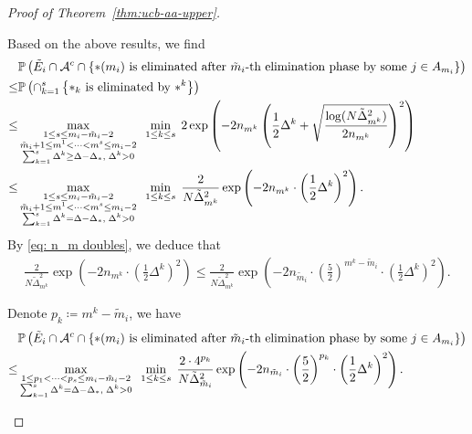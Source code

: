 \documentclass[
  12pt]{article}
\begin{document}
\begin{proof}[Proof of Theorem~\ref{thm:ucb-aa-upper}]
\begin{itemize}
Based on the above results, we find
\begin{align}
&\mathbb{P}\left(\tilde{E}_i\cap\mathcal{A}^c\cap\left\{\text{$*(m_i)$ is eliminated after $\tilde{m}_i$-th elimination phase } \text{by some }j\in A_{m_i}\right\}\right)\notag\\
    \leq &\mathbb{P}\left(\cap_{k=1}^{s} \left\{\text{$*_k$ is eliminated by $*^k$}\right\} \right)\notag\\
    \leq &\max_{\substack{1\leq s\leq m_i-\tilde{m}_i-2\\\tilde{m}_i+1\leq m^1<\cdots <m^{s}\leq m_i-2\\ \sum _{k=1}^{s}\Delta^k\geq \Delta-\Delta_*,\; \Delta^k>0}}\;\;\min_{1\leq k\leq s}\;2\exp\left(-2n_{m^k}\left(\frac{1}{2}\Delta^k +\sqrt{\frac{\log(N \tilde{\Delta}_{m^k}^2)}{2n_{m^k}}}\right)^2\right)\notag\\
    \leq & \max_{\substack{1\leq s\leq m_i-\tilde{m}_i-2\\\tilde{m}_i+1\leq m^1<\cdots <m^{s}\leq m_i-2\\ \sum _{k=1}^{s}\Delta^k= \Delta-\Delta_*,\; \Delta^k>0}}\;\;\min_{1\leq k\leq s}\;\frac{2}{N\tilde{\Delta}_{m^k}^2}\exp\left(-2n_{m^k}\cdot \left(\frac{1}{2}\Delta^{k}\right)^2\right).
    \label{eq: A-3 G-3 b2 optimization problem}
\end{align}
By \eqref{eq: n_m doubles}, we deduce that
\begin{align*}
    \frac{2}{N\tilde{\Delta}_{m^k}^2}\exp\left(-2n_{m^k}\cdot \left(\frac{1}{2}\Delta^{k}\right)^2\right)\leq \frac{2}{N\tilde{\Delta}_{m^k}^2}\exp\left(-2n_{\tilde{m}_i}\cdot \left(\frac{5}{2}\right)^{m^k-\tilde{m}_i}\cdot \left(\frac{1}{2}\Delta^{k}\right)^2\right).
\end{align*}

Denote $p_k\coloneqq m^k-\tilde{m}_i$, we have
\begin{align}
&\mathbb{P}\left(\tilde{E}_i\cap\mathcal{A}^c\cap\left\{\text{$*(m_i)$ is eliminated after $\tilde{m}_i$-th elimination phase } \text{by some }j\in A_{m_i}\right\}\right)\notag\\
    \leq &\max_{\substack{1\leq p_1<\cdots <p_{s}\leq m_i-\tilde{m}_i-2\\ \sum _{k=1}^{s}\Delta^k= \Delta-\Delta_*,\; \Delta^k>0}}\;\;\min_{1\leq k\leq s}\;\frac{2\cdot 4^{p_k}}{N\tilde{\Delta}_{\tilde{m}_i}^2}\exp\left(-2n_{\tilde{m}_i}\cdot \left(\frac{5}{2}\right)^{p_k}\cdot \left(\frac{1}{2}\Delta^{k}\right)^2\right).
    \label{eq: A-3 G-3 b2 optimization new}
\end{align}


\end{itemize}
\end{proof}
\end{document}
